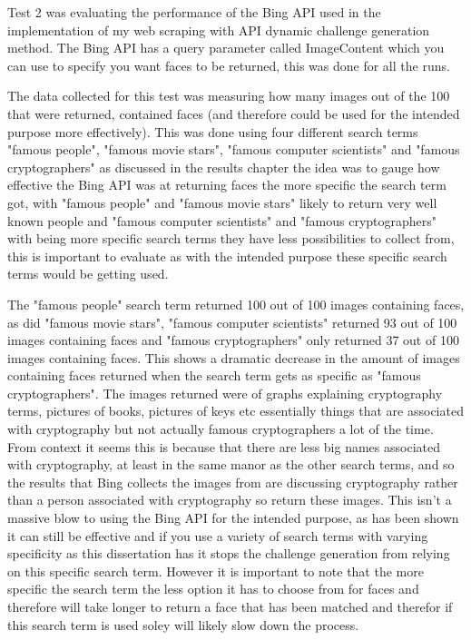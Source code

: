 \documentclass[12pt,a4paper]{article}
\begin{document}
Test 2 was evaluating the performance of the Bing API used in the implementation of my web scraping with API dynamic challenge generation method. The Bing API has a query parameter called ImageContent which you can use to specify you want faces to be returned, this was done for all the runs.

The data collected for this test was measuring how many images out of the 100 that were returned, contained faces (and therefore could be used for the intended purpose more effectively). This was done using four different search terms "famous people", "famous movie stars", "famous computer scientists" and "famous cryptographers" as discussed in the results chapter the idea was to gauge how effective the Bing API was at returning faces the more specific the search term got, with "famous people" and "famous movie stars" likely to return very well known people and "famous computer scientists" and "famous cryptographers" with being more specific search terms they have less possibilities to collect from, this is important to evaluate as with the intended purpose these specific search terms would be getting used.  

The "famous people" search term returned 100 out of 100 images containing faces, as did "famous movie stars", "famous computer scientists" returned 93 out of 100 images containing faces and "famous cryptographers" only returned 37 out of 100 images containing faces. This shows a dramatic decrease in the amount of images containing faces returned when the search term gets as specific as "famous cryptographers". The images returned were of graphs explaining cryptography terms, pictures of books, pictures of keys etc essentially things that are associated with cryptography but not actually famous cryptographers a lot of the time. From context it seems this is because that there are less big names associated with cryptography, at least in the same manor as the other search terms, and so the results that Bing collects the images from are discussing cryptography rather than a person associated with cryptography so return these images. This isn't a massive blow to using the Bing API for the intended purpose, as has been shown it can still be effective and if you use a variety of search terms with varying specificity as this dissertation has it stops the challenge generation from relying on this specific search term. However it is important to note that the more specific the search term the less option it has to choose from for faces and therefore will take longer to return a face that has been matched and therefor if this search term is used soley will likely slow down the process. 
\end{document}
